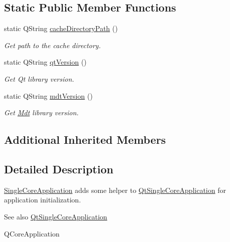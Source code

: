 \subsection*{Static Public Member Functions}
\begin{DoxyCompactItemize}
\item 
static Q\+String \hyperlink{class_mdt_1_1_single_core_application_a9081eaa0ddfc35ed1360f64fbe52c18a}{cache\+Directory\+Path} ()
\begin{DoxyCompactList}\small\item\em Get path to the cache directory. \end{DoxyCompactList}\item 
static Q\+String \hyperlink{class_mdt_1_1_single_core_application_a19c7ede35e9fe6beca09d49235327a34}{qt\+Version} ()\hypertarget{class_mdt_1_1_single_core_application_a19c7ede35e9fe6beca09d49235327a34}{}\label{class_mdt_1_1_single_core_application_a19c7ede35e9fe6beca09d49235327a34}

\begin{DoxyCompactList}\small\item\em Get Qt library version. \end{DoxyCompactList}\item 
static Q\+String \hyperlink{class_mdt_1_1_single_core_application_a17db75d06f3ba6be926f39620c45b383}{mdt\+Version} ()\hypertarget{class_mdt_1_1_single_core_application_a17db75d06f3ba6be926f39620c45b383}{}\label{class_mdt_1_1_single_core_application_a17db75d06f3ba6be926f39620c45b383}

\begin{DoxyCompactList}\small\item\em Get \hyperlink{namespace_mdt}{Mdt} library version. \end{DoxyCompactList}\end{DoxyCompactItemize}
\subsection*{Additional Inherited Members}


\subsection{Detailed Description}
\hyperlink{class_mdt_1_1_single_core_application}{Single\+Core\+Application} adds some helper to \hyperlink{class_qt_single_core_application}{Qt\+Single\+Core\+Application} for application initialization. 

\begin{DoxySeeAlso}{See also}
\hyperlink{class_qt_single_core_application}{Qt\+Single\+Core\+Application} 

Q\+Core\+Application 
\end{DoxySeeAlso}


